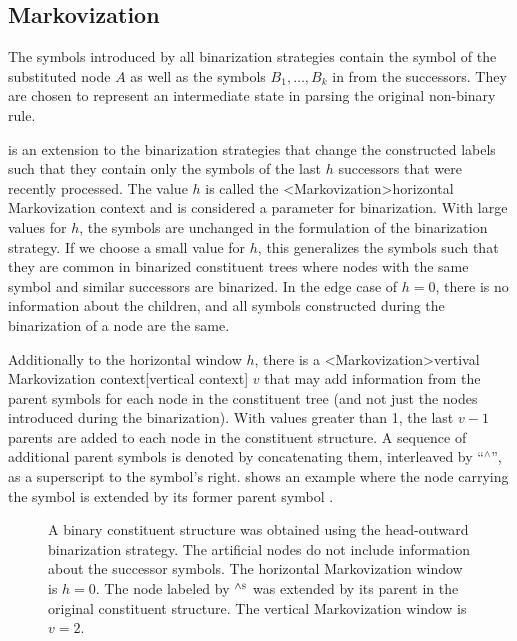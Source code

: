 \documentclass[../../document.tex]{subfiles}
\begin{document}
    \subsection{Markovization}
    The symbols introduced by all binarization strategies contain the symbol of the substituted node \(A\) as well as the symbols \(B_1, \ldots, B_k\) in from the successors.
    They are chosen to represent an intermediate state in parsing the original non-binary rule.

     is an extension to the binarization strategies that change the constructed labels such that they contain only the symbols of the last \(h\) successors that were recently processed.
    The value \(h\) is called the <Markovization>{horizontal Markovization context} and is considered a parameter for binarization.
    With large values for \(h\), the symbols are unchanged in the formulation of the binarization strategy.
    If we choose a small value for \(h\), this generalizes the symbols such that they are common in binarized constituent trees where nodes with the same symbol and similar successors are binarized.
    In the edge case of \(h=0\), there is no information about the children, and all symbols constructed during the binarization of a node are the same.

    Additionally to the horizontal window \(h\), there is a <Markovization>{vertival Markovization context}[vertical context] \(v\) that may add information from the parent symbols for each node in the constituent tree (and not just the nodes introduced during the binarization).
    With values greater than 1, the last \(v-1\) parents are added to each node in the constituent structure.
    A sequence of additional parent symbols is denoted by concatenating them, interleaved by ``$^\wedge$'', as a superscript to the symbol's right.
     shows an example where the node carrying the symbol  is extended by its former parent symbol .

    \begin{figure}
        \centering
        
        \caption{\label{fig:ex:markovization}
            A binary constituent structure was obtained using the head-outward binarization strategy.
            The artificial nodes do not include information about the successor symbols. The horizontal Markovization window is \(h = 0\).
            The node labeled by $^{\wedge\textsc{s}}$ was extended by its parent in the original constituent structure. The vertical Markovization window is \(v = 2\).}
    \end{figure}
\end{document}

